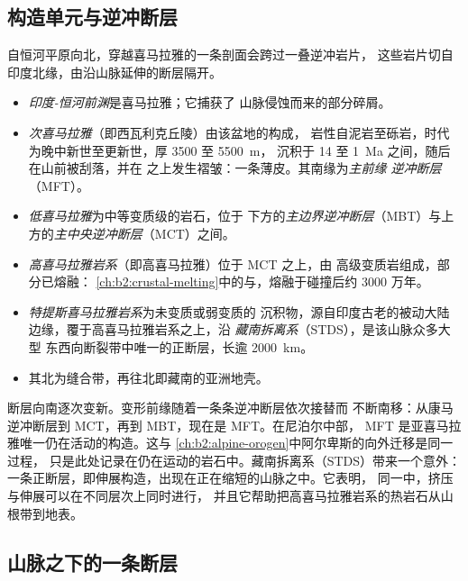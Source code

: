 \subsection{构造单元与逆冲断层}

自恒河平原向北，穿越喜马拉雅的一条剖面会跨过一叠逆冲岩片，
这些岩片切自印度北缘，由沿山脉延伸的断层隔开。
\begin{itemize}
\item \emph{印度-恒河前渊}是喜马拉雅；它捕获了
山脉侵蚀而来的部分碎屑。
\item \emph{次喜马拉雅}（即西瓦利克丘陵）由该盆地的构成，
岩性自泥岩至砾岩，时代为晚中新世至更新世，厚 3500 至 \qty{5500}{m}，
沉积于 14 至 \qty{1}{Ma} 之间，随后在山前被刮落，并在
之上发生褶皱：一条薄皮。其南缘为\emph{主前缘
逆冲断层}（MFT）。
\item \emph{低喜马拉雅}为中等变质级的岩石，位于
下方的\emph{主边界逆冲断层}（MBT）与上方的\emph{主中央逆冲断层}（MCT）之间。
\item \emph{高喜马拉雅岩系}（即高喜马拉雅）位于 MCT 之上，由
高级变质岩组成，部分已熔融：
\cref{ch:b2:crustal-melting}中的与，熔融于碰撞后约 3000 万年。
\item \emph{特提斯喜马拉雅岩系}为未变质或弱变质的
沉积物，源自印度古老的被动大陆边缘，覆于高喜马拉雅岩系之上，沿
\emph{藏南拆离系}（STDS），是该山脉众多大型
东西向断裂带中唯一的正断层，长逾 \qty{2000}{km}。
\item 其北为缝合带，再往北即藏南的亚洲地壳。
\end{itemize}

断层向南逐次变新。变形前缘随着一条条逆冲断层依次接替而
不断南移：从康马逆冲断层到 MCT，再到 MBT，现在是 MFT。在尼泊尔中部，
MFT 是亚喜马拉雅唯一仍在活动的构造。这与
\cref{ch:b2:alpine-orogen}中阿尔卑斯的向外迁移是同一过程，
只是此处记录在仍在运动的岩石中。藏南拆离系（STDS）带来一个意外：
一条正断层，即伸展构造，出现在正在缩短的山脉之中。它表明，
同一中，挤压与伸展可以在不同层次上同时进行，
并且它帮助把高喜马拉雅岩系的热岩石从山根带到地表。

\subsection{山脉之下的一条断层}

